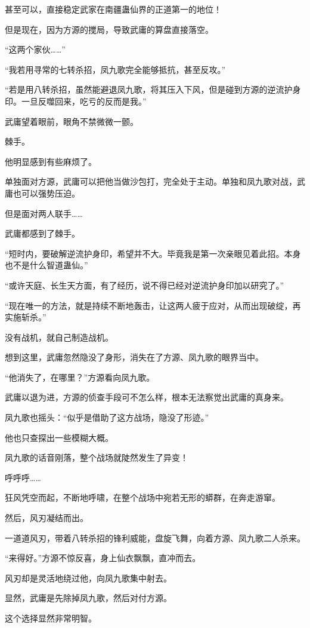 \begin{this_body}
甚至可以，直接稳定武家在南疆蛊仙界的正道第一的地位！

但是现在，因为方源的搅局，导致武庸的算盘直接落空。

“这两个家伙……”

“我若用寻常的七转杀招，凤九歌完全能够抵抗，甚至反攻。”

“若是用八转杀招，虽然能避退凤九歌，将其压入下风，但是碰到方源的逆流护身印。一旦反噬回来，吃亏的反而是我。”

武庸望着眼前，眼角不禁微微一颤。

棘手。

他明显感到有些麻烦了。

单独面对方源，武庸可以把他当做沙包打，完全处于主动。单独和凤九歌对战，武庸也可以强势压迫。

但是面对两人联手……

武庸都感到了棘手。

“短时内，要破解逆流护身印，希望并不大。毕竟我是第一次亲眼见着此招。本身也不是什么智道蛊仙。”

“或许天庭、长生天方面，有了经历，说不得已经对逆流护身印加以研究了。”

“现在唯一的方法，就是持续不断地轰击，让这两人疲于应对，从而出现破绽，再实施斩杀。”

没有战机，就自己制造战机。

想到这里，武庸忽然隐没了身形，消失在了方源、凤九歌的眼界当中。

“他消失了，在哪里？”方源看向凤九歌。

武庸以退为进，方源的侦查手段可不怎么样，根本无法察觉出武庸的真身来。

凤九歌也摇头：“似乎是借助了这方战场，隐没了形迹。”

他也只查探出一些模糊大概。

凤九歌的话音刚落，整个战场就陡然发生了异变！

呼呼呼……

狂风凭空而起，不断地呼啸，在整个战场中宛若无形的蟒群，在奔走游窜。

然后，风刃凝结而出。

一道道风刃，带着八转杀招的锋利威能，盘旋飞舞，向着方源、凤九歌二人杀来。

“来得好。”方源不惊反喜，身上仙衣飘飘，直冲而去。

风刃却是灵活地绕过他，向凤九歌集中射去。

显然，武庸是先除掉凤九歌，然后对付方源。

这个选择显然非常明智。


\end{this_body}
